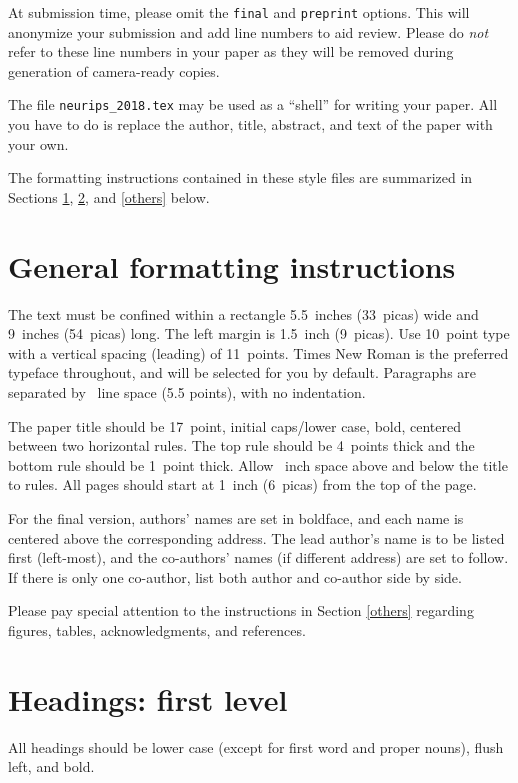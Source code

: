 \documentclass{article}
\begin{document}
At submission time, please omit the \verb+final+ and \verb+preprint+
options. This will anonymize your submission and add line numbers to aid
review. Please do \emph{not} refer to these line numbers in your paper as they
will be removed during generation of camera-ready copies.

The file \verb+neurips_2018.tex+ may be used as a ``shell'' for writing your
paper. All you have to do is replace the author, title, abstract, and text of
the paper with your own.

The formatting instructions contained in these style files are summarized in
Sections \ref{gen_inst}, \ref{headings}, and \ref{others} below.

\section{General formatting instructions}
\label{gen_inst}

The text must be confined within a rectangle 5.5~inches (33~picas) wide and
9~inches (54~picas) long. The left margin is 1.5~inch (9~picas).  Use 10~point
type with a vertical spacing (leading) of 11~points.  Times New Roman is the
preferred typeface throughout, and will be selected for you by default.
Paragraphs are separated by ~line space (5.5 points), with no
indentation.

The paper title should be 17~point, initial caps/lower case, bold, centered
between two horizontal rules. The top rule should be 4~points thick and the
bottom rule should be 1~point thick. Allow ~inch space above and
below the title to rules. All pages should start at 1~inch (6~picas) from the
top of the page.

For the final version, authors' names are set in boldface, and each name is
centered above the corresponding address. The lead author's name is to be listed
first (left-most), and the co-authors' names (if different address) are set to
follow. If there is only one co-author, list both author and co-author side by
side.

Please pay special attention to the instructions in Section \ref{others}
regarding figures, tables, acknowledgments, and references.

\section{Headings: first level}
\label{headings}

All headings should be lower case (except for first word and proper nouns),
flush left, and bold.
\end{document}
